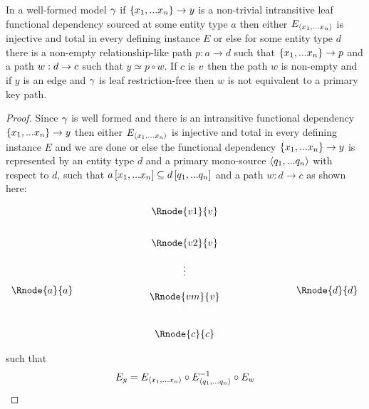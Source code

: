 \begin{lemma}
\label{intransitivelemma}
In a well-formed model $\gamma$  if $\left\{x_1,...x_n\right\} \rightarrow y$  is a non-trivial intransitive leaf
functional dependency sourced at some entity type $a$ then either $E_{\langle x_1,...x_n\rangle}$ is injective and total in every defining instance $E$ 
or else for some entity type $d$ there is a non-empty relationship-like path $p:a \rightarrow d$ such that $\{x_1,...x_n\} \rightarrow p$
and a  path $w:d \rightarrow c$  such that $y \simeq p \circ w$. If $c$ is $v$ then
the path $w$ is non-empty and if $y$ is an edge and $\gamma$ is leaf restriction-free then $w$ is not equivalent to a primary key path.
\end{lemma}
\begin{proof}
Since $\gamma$ is well formed  and there is an intransitive functional dependency $\left\{x_1,...x_n\right\} \rightarrow y$ then either $E_{\langle x_1,...x_n\rangle}$ is injective and total in every defining instance $E$  and we are done or else the functional dependency
$\left\{x_1,...x_n\right\} \rightarrow y$   is represented 
by  an entity type $d$ and 
a primary mono-source $\langle q_1,...q_n\rangle$ with respect to
$d$, such that $a\left[x_1,...x_n\right]\subseteq d\left[q_1,...q_n\right]$ and a 
path $w:d\rightarrow c$ as shown here:

\setlength{\arraycolsep}{.2cm}
\begin{center}
$
\begin{array}{cp{2cm}c p{2cm} c}
             &  & \Rnode{v1}{\veee} & &               \\ [0.7cm]
						 &  & \Rnode{v2}{\veee} & &               \\ [0.4cm]
						 &  &     \vdots      & &               \\ [0.2cm]
\Rnode{a}{a} &  &                 & & \Rnode{d}{d}  \\ [-0.2cm]
             &  & \Rnode{vm}{\veee} & &               \\ [0.9cm]
             &  & \Rnode{c}{c}    & &               \\
\end{array}
$
\end{center}
such that
\begin{equation}
\label{fundependency}
E_y = E_{\langle x_1,...x_n\rangle} \circ E_{\langle q_1,...q_n\rangle}^{-1} \circ E_w
\end{equation}


\end{proof}
